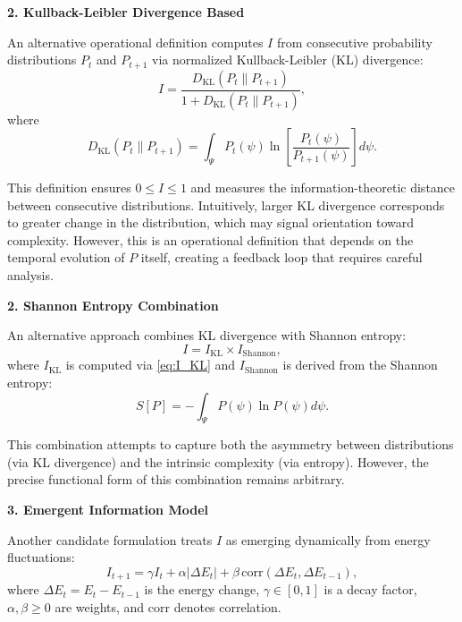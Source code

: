 \documentclass[12pt,a4paper]{article}
\theoremstyle{definition}
\theoremstyle{remark}
\begin{document}
\textbf{2. Kullback-Leibler Divergence Based}

An alternative operational definition computes $I$ from consecutive probability distributions $P_t$ and $P_{t+1}$ via normalized Kullback-Leibler (KL) divergence:
\begin{equation}\label{eq:I_KL}
I = \frac{D_{\mathrm{KL}}(P_t \parallel P_{t+1})}{1 + D_{\mathrm{KL}}(P_t \parallel P_{t+1})},
\end{equation}
where
\begin{equation}
D_{\mathrm{KL}}(P_t \parallel P_{t+1}) = \int_\Psi P_t(\psi) \ln\left[\frac{P_t(\psi)}{P_{t+1}(\psi)}\right] d\psi.
\end{equation}

This definition ensures $0 \leq I \leq 1$ and measures the information-theoretic distance between consecutive distributions. Intuitively, larger KL divergence corresponds to greater change in the distribution, which may signal orientation toward complexity. However, this is an operational definition that depends on the temporal evolution of $P$ itself, creating a feedback loop that requires careful analysis.

\textbf{2. Shannon Entropy Combination}

An alternative approach combines KL divergence with Shannon entropy:
\begin{equation}
I = I_{\mathrm{KL}} \times I_{\mathrm{Shannon}},
\end{equation}
where $I_{\mathrm{KL}}$ is computed via \eqref{eq:I_KL} and $I_{\mathrm{Shannon}}$ is derived from the Shannon entropy:
\begin{equation}
S[P] = -\int_\Psi P(\psi) \ln P(\psi) d\psi.
\end{equation}

This combination attempts to capture both the asymmetry between distributions (via KL divergence) and the intrinsic complexity (via entropy). However, the precise functional form of this combination remains arbitrary.

\textbf{3. Emergent Information Model}

Another candidate formulation treats $I$ as emerging dynamically from energy fluctuations:
\begin{equation}\label{eq:I_emergent}
I_{t+1} = \gamma I_t + \alpha |\Delta E_t| + \beta \, \mathrm{corr}(\Delta E_t, \Delta E_{t-1}),
\end{equation}
where $\Delta E_t = E_t - E_{t-1}$ is the energy change, $\gamma \in [0,1]$ is a decay factor, $\alpha, \beta \geq 0$ are weights, and $\mathrm{corr}$ denotes correlation.
\end{document}
